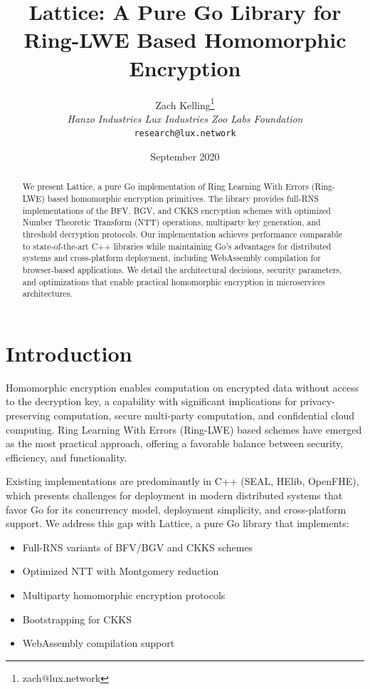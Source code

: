 \documentclass[11pt,a4paper]{article}
\title{\textbf{Lattice: A Pure Go Library for Ring-LWE Based Homomorphic Encryption}}
\author{Zach Kelling\thanks{zach@lux.network} \\ \textit{Hanzo Industries \quad Lux Industries \quad Zoo Labs Foundation} \\ \texttt{research@lux.network}}
\date{September 2020}
\theoremstyle{definition}
\begin{document}
\maketitle

\begin{abstract}
We present Lattice, a pure Go implementation of Ring Learning With Errors (Ring-LWE) based homomorphic encryption primitives. The library provides full-RNS implementations of the BFV, BGV, and CKKS encryption schemes with optimized Number Theoretic Transform (NTT) operations, multiparty key generation, and threshold decryption protocols. Our implementation achieves performance comparable to state-of-the-art C++ libraries while maintaining Go's advantages for distributed systems and cross-platform deployment, including WebAssembly compilation for browser-based applications. We detail the architectural decisions, security parameters, and optimizations that enable practical homomorphic encryption in microservices architectures.
\end{abstract}

\section{Introduction}

Homomorphic encryption enables computation on encrypted data without access to the decryption key, a capability with significant implications for privacy-preserving computation, secure multi-party computation, and confidential cloud computing. Ring Learning With Errors (Ring-LWE) based schemes have emerged as the most practical approach, offering a favorable balance between security, efficiency, and functionality.

Existing implementations are predominantly in C++ (SEAL, HElib, OpenFHE), which presents challenges for deployment in modern distributed systems that favor Go for its concurrency model, deployment simplicity, and cross-platform support. We address this gap with Lattice, a pure Go library that implements:

\begin{itemize}
\item Full-RNS variants of BFV/BGV and CKKS schemes
\item Optimized NTT with Montgomery reduction
\item Multiparty homomorphic encryption protocols
\item Bootstrapping for CKKS
\item WebAssembly compilation support
\end{itemize}
\end{document}
